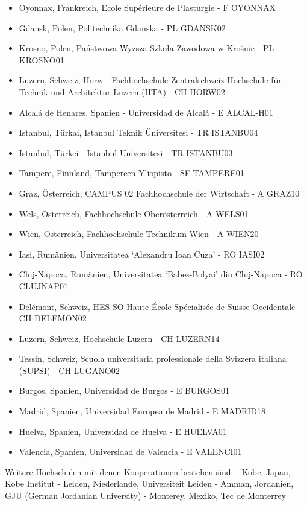 \begin{itemize}
\tightlist
\item
  Oyonnax, Frankreich, Ecole Supérieure de Plasturgie - F OYONNAX
\item
  Gdansk, Polen, Politechnika Gdanska - PL GDANSK02
\item
  Krosno, Polen, Państwowa Wyższa Szkoła Zawodowa w Krośnie - PL
  KROSNO01
\item
  Luzern, Schweiz, Horw - Fachhochschule Zentralschweiz Hochschule für
  Technik und Architektur Luzern (HTA) - CH HORW02
\item
  Alcalá de Henares, Spanien - Universidad de Alcalá - E ALCAL-H01
\item
  Istanbul, Türkai, Istanbul Teknik Üniversitesi - TR ISTANBU04
\item
  Istanbul, Türkei - Istanbul Universitesi - TR ISTANBU03
\item
  Tampere, Finnland, Tampereen Yliopisto - SF TAMPERE01
\item
  Graz, Österreich, CAMPUS 02 Fachhochschule der Wirtschaft - A GRAZ10
\item
  Wels, Österreich, Fachhochschule Oberösterreich - A WELS01
\item
  Wien, Österreich, Fachhochschule Technikum Wien - A WIEN20
\item
  Iași, Rumänien, Universitatea `Alexandru Ioan Cuza' - RO IASI02
\item
  Cluj-Napoca, Rumänien, Universitatea `Babes-Bolyai' din Cluj-Napoca -
  RO CLUJNAP01
\item
  Delémont, Schweiz, HES-SO Haute École Spécialisée de Suisse
  Occidentale - CH DELEMON02
\item
  Luzern, Schweiz, Hochschule Luzern - CH LUZERN14
\item
  Tessin, Schweiz, Scuola universitaria professionale della Svizzera
  italiana (SUPSI) - CH LUGANO02
\item
  Burgos, Spanien, Universidad de Burgos - E BURGOS01
\item
  Madrid, Spanien, Universidad Europea de Madrid - E MADRID18
\item
  Huelva, Spanien, Universidad de Huelva - E HUELVA01
\item
  Valencia, Spanien, Universidad de Valencia - E VALENCI01
\end{itemize}

Weitere Hochschulen mit denen Kooperationen bestehen sind: - Kobe,
Japan, Kobe Institut - Leiden, Niederlande, Universiteit Leiden - Amman,
Jordanien, GJU (German Jordanian University) - Monterey, Mexiko, Tec de
Monterrey

